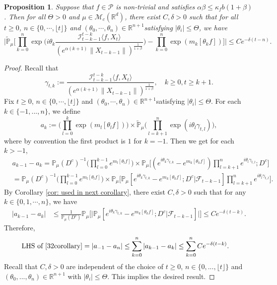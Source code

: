 \documentclass[12pt,a4paper]{amsart}
\theoremstyle{plain}
\newtheorem{prop}[thm]{Proposition}
\theoremstyle{definition}
\numberwithin{equation}{section}
\begin{document}
\begin{prop}\label{cor: indepedent of the limit zeta for critical and small}
   Suppose that $f\in \mathcal{P}$ is non-trivial and satisfies $\alpha\beta\leq\kappa_fb(1+\beta)$.
    Then for all $\Theta >0$ and $\mu\in \mathcal M_c(\mathbb R^d)$, there exist $C,\delta>0$ such that for all $t\geq 0$, $n \in \{0, \cdots, \lfloor t \rfloor\}$ and $(\theta_0, \cdots, \theta_n)\in \mathbb R^{n+1}$satisfying $|\theta_i|\leq \Theta$, we have
\begin{equation}
\label{32corollary}
    \Big|\mathbb{\widetilde{P}}_{\mu}\Big[\prod_{k=0}^n\exp\Big(i\theta_k \frac {\mathcal I_{t-k-1}^{t-k}\langle f ,X_t\rangle}{(e^{\alpha (k+1)}\|X_{t-k-1}\|)^\frac{1}{1+\beta}}\Big)-\prod_{k=0}^n\exp(m_k[\theta_k f])\Big]\Big|\leq C e^{-\delta(t-n)}.
\end{equation}
\end{prop}
\begin{proof}
    Recall that \[\gamma_{t,k}:=\frac {\mathcal I_{t-k-1}^{t-k}\langle f ,X_t\rangle}{(e^{\alpha( k+1)}\|X_{t-k-1}\|)^\frac{1}{1+\beta}},\quad k \geq 0, t\geq k+1. \]
    Fix $t\geq 0$, $n \in \{0, \cdots, \lfloor t \rfloor\}$ and $(\theta_0, \cdots, \theta_n)\in \mathbb R^{n+1}$satisfying $|\theta_i|\leq \Theta$.
    For each $k\in\{-1,...,n\}$, we define
\[
    a_k
    :=\Big(\prod_{l=0}^{k}\exp(m_l[\theta_lf])\Big) \times \mathbb{\widetilde{P}}_{\mu}\Big(\prod_{l=k+1}^{n}\exp\left(i\theta_l\gamma_{t,l}\right)\Big),
\]
    where by convention the first product is $1$ for $k=-1$. Then we get for each $k > -1$,
\begin{align}
    &a_{k-1} - a_k
    =\mathbb{P}_{\mu}(D^c)^{-1}\Big(\prod_{l=0}^{k-1}e^{m_l[\theta_l f]}\Big) \times \mathbb{P}_{\mu}\Big[(e^{i\theta_{k}\gamma_{t,k}}-e^{m_k[\theta_k f]})\prod_{l=k+1}^ne^{i\theta_{l}\gamma_{t,l}};D^c\Big]
    \\&=\mathbb{P}_{\mu}(D^c)^{-1} \Big(\prod_{l=0}^{k-1}e^{m_l[\theta_l f]}\Big) \times \mathbb{P}_{\mu}\Big[\mathbb P_\mu[e^{i\theta_{k}\gamma_{t,k}}-e^{m_k[\theta_k f]}; D^c|\mathscr F_{t-k-1}]\prod_{l=k+1}^ne^{i\theta_{l}\gamma_{t,l}}\Big].
\end{align}
    By Corollary \ref{cor: used in next corollary}, there exist $C,\delta>0$ such that for any $k\in\{0, 1, \cdots, n\}$, we have
\begin{align}
    |a_{k-1}- a_k|
    &\leq \frac{1}{\mathbb{P}_{\mu}(D^c)}\mathbb{P}_{\mu}\Big[\big|\mathbb P_\mu[e^{i\theta_{k}\gamma_{t,k}}-e^{m_k[\theta_k f]}; D^c\big|\mathscr{F}_{t-k-1}]\big|\Big]
    \leq C e^{-\delta(t-k)}.
\end{align}
    Therefore,
\begin{align}
    \text{LHS of \eqref{32corollary}}&= \left|a_{-1}-a_n\right|
    \leq\sum_{k=0}^n\left|a_{k-1}-a_k\right|
    \leq \sum_{k=0}^n C e^{-\delta(t-k)}.
\end{align}
	Recall that $C, \delta>0$ are independent of the choice of $t\geq 0$, $n \in \{0,...,\lfloor t \rfloor\}$ and $(\theta_0,...,\theta_n)\in \mathbb R^{n+1}$ with $|\theta_i|\leq \Theta$.
    This implies the desired result.
\end{proof}
\end{document}
